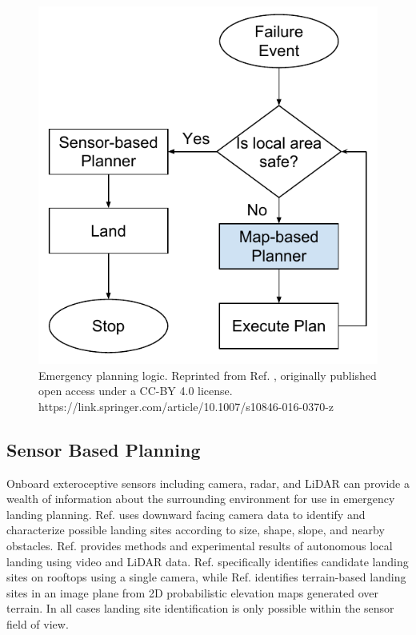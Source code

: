 \begin{figure}[ht]
\includegraphics[scale=.65]{chapter_5_mapping/imgs/meta-level-planner.pdf}
\centering
\caption[Emergency planning logic.]{Emergency planning logic. Reprinted from Ref. \cite{ten_harmsel_emergency_2017}, originally published open access under a CC-BY 4.0 license. https://link.springer.com/article/10.1007/s10846-016-0370-z}
\label{fig:ch5_meta-level-planner}       %
\end{figure}



\subsection{Sensor Based Planning}\label{sec:ch5_local_sensor}
Onboard exteroceptive sensors including camera, radar, and LiDAR can provide a wealth of information about the surrounding environment for use in emergency landing planning. Ref. \cite{warren_enabling_2015} uses downward facing camera data to identify and characterize possible landing sites according to size, shape, slope, and nearby obstacles.
Ref. \cite{theodore_flight_2006} provides methods and experimental results of autonomous local landing using video and LiDAR data. Ref. \cite{desaraju_vision-based_2015} specifically identifies candidate landing sites on rooftops using a single camera, while Ref. \cite{forster_continuous_2015} identifies terrain-based landing sites in an image plane from 2D probabilistic elevation maps generated over terrain. In all cases landing site identification is only possible within the sensor field of view.

